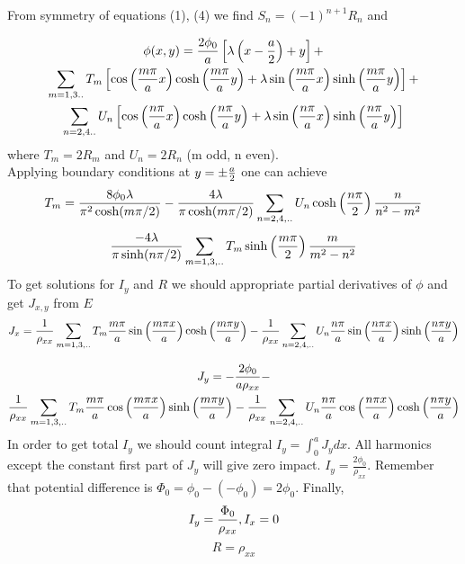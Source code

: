 \documentclass[a4paper]{article}
\begin{document}
From symmetry of equations (1), (4)  we find $S_n = (-1)^{n+1} R_n$ and 

\begin{multline}
\phi(x,y) = {2 \phi_0 \over a} \left[ \lambda \left( x - {a \over 2}   \right) + y \right] + \\
\sum_{m = 1,3..} T_m \left[ \cos \left( {m \pi \over a} x \right) \cosh \left( {m \pi \over a } y \right) + \lambda \sin \left( {m \pi \over a  } x \right) \sinh \left(  { m \pi \over a } y \right) \right] + \\
\sum_{n = 2,4..} U_n \left[ \cos \left( {n \pi \over a} x \right) \cosh \left( {n \pi \over a } y \right) + \lambda \sin \left( {n \pi \over a  } x\right) \sinh \left(  { n \pi \over a } y \right) \right]
\end{multline}
where $T_m = 2 R_m$ and $U_n = 2 R_n$ (m odd, n even).
\\
Applying boundary conditions at $y = \pm {a \over 2}$ one can achieve 
\begin{equation}
T_m = \frac{8 \phi_0 \lambda}{\pi^2 \cosh (m \pi /2)} - \frac{4 \lambda}{\pi \cosh (m \pi /2)} \sum_{n = 2,4, ..} U_n \cosh \left( {n \pi \over 2} \right) \frac{n}{n^2 - m^2}
\end{equation}
\begin{equation}
\frac{-4 \lambda}{\pi \sinh (n \pi / 2)} \sum_{m = 1,3,..} T_m \sinh \left( {m \pi \over 2} \right) \frac{m}{m^2-n^2}
\end{equation}
To get solutions for $I_y$ and $R$ we should appropriate partial derivatives of $\phi$ and get $J_{x,y}$ from $E$
\begin{equation}
J_x = {1 \over \rho_{xx}} \sum_{m = 1,3,..} T_m {m \pi \over a} \sin \left( m \pi x \over a \right) \cosh \left( m \pi y \over a \right) - 
{1 \over \rho_{xx}} \sum_{n = 2,4,..} U_n {n \pi \over a} \sin \left( n \pi x \over a \right) \sinh \left( n \pi y \over a \right)
\end{equation}

\begin{multline}
J_y = -\frac{2 \phi_0}{a \rho_{xx}} - \\
{1 \over \rho_{xx}} \sum_{m = 1,3,..} T_m {m \pi \over a} \cos \left( m \pi x \over a \right) \sinh \left( m \pi y \over a \right) - 
{1 \over \rho_{xx}} \sum_{n = 2,4,..} U_n {n \pi \over a} \cos \left( n \pi x \over a \right) \cosh \left( n \pi y \over a \right)
\end{multline}
In order to get total $I_y$ we should count integral $I_y = \int_0^a J_y dx$. All harmonics except the constant first part of $J_y$ will give zero impact. $I_y = \frac{2 \phi_0}{\rho_{xx}}$.  Remember that potential difference is $\Phi_0 = \phi_0 - (-\phi_0) = 2 \phi_0$. Finally, 
\begin{equation}
I_y = {\Phi_0 \over \rho_{xx}}, I_x = 0
\end{equation}
\begin{equation}
R = \rho_{xx}
\end{equation}
\end{document}
